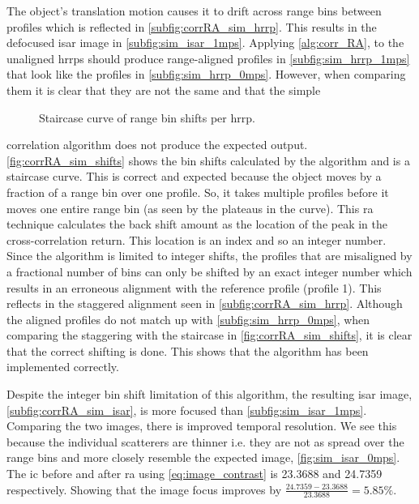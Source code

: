 \documentclass[class=report,11pt,crop=false]{standalone}
\begin{document}
    The object's translation motion causes it to drift across range bins between profiles which is reflected in \autoref{subfig:corrRA_sim_hrrp}. This results in the defocused \gls{isar} image in \autoref{subfig:sim_isar_1mps}. Applying \autoref{alg:corr_RA}, to the unaligned \gls{hrrp}s should produce range-aligned profiles in \autoref{subfig:sim_hrrp_1mps} that look like the profiles in \autoref{subfig:sim_hrrp_0mps}. However, when comparing them it is clear that they are not the same and that the simple 
    \begin{wrapfigure}{l}{0.45\linewidth}
      \centering
      \vspace*{-\baselineskip}
      \resizebox{\linewidth}{!}{}
      \caption{Staircase curve of range bin shifts per \gls{hrrp}.\label{fig:corrRA_sim_shifts}}
      \vspace*{-\baselineskip}
    \end{wrapfigure}
    correlation algorithm does not produce the expected output. \autoref{fig:corrRA_sim_shifts} shows the bin shifts calculated by the algorithm and is a staircase curve. This is correct and expected because the object moves by a fraction of a range bin over one profile. So, it takes multiple profiles before it moves one entire range bin (as seen by the plateaus in the curve). This \gls{ra} technique calculates the back shift amount as the location of the peak in the cross-correlation return. This location is an index and so an integer number. Since the algorithm is limited to integer shifts, the profiles that are misaligned by a fractional number of bins can only be shifted by an exact integer number which results in an erroneous alignment with the reference profile (profile 1). This reflects in the staggered alignment seen in \autoref{subfig:corrRA_sim_hrrp}. Although the aligned profiles do not match up with \autoref{subfig:sim_hrrp_0mps}, when comparing the staggering with the staircase in \autoref{fig:corrRA_sim_shifts}, it is clear that the correct shifting is done. This shows that the algorithm has been implemented correctly. 
    
    Despite the integer bin shift limitation of this algorithm, the resulting \gls{isar} image, \autoref{subfig:corrRA_sim_isar}, is more focused than \autoref{subfig:sim_isar_1mps}. Comparing the two images, there is improved temporal resolution. We see this because the individual scatterers are thinner i.e. they are not as spread over the range bins and more closely resemble the expected image, \autoref{fig:sim_isar_0mps}. The \gls{ic} before and after \gls{ra} using \autoref{eq:image_contrast} is 23.3688 and 24.7359 respectively. Showing that the image focus improves by \( \frac{24.7359 - 23.3688}{23.3688} = 5.85\% \).
\end{document}
